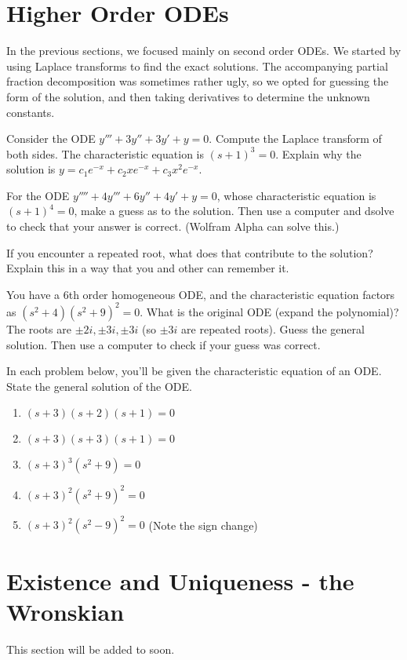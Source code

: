 \section{Higher Order ODEs}
In the previous sections, we focused mainly on second order ODEs.  We started by using Laplace transforms to find the exact solutions.  The accompanying partial fraction decomposition was sometimes rather ugly, so we opted for guessing the form of the solution, and then taking derivatives to determine the unknown constants. 

\begin{problem}
 Consider the ODE $y'''+3y''+3y'+y=0$.  Compute the Laplace transform of both sides.  The characteristic equation is $(s+1)^3=0$. Explain why the solution is $y = c_1 e^{-x}+c_2 x e^{-x}+c_3 x^2e^{-x}.$ 

 For the ODE $y''''+4y'''+6y''+4y'+y=0$, whose characteristic equation is $(s+1)^4=0$, make a guess as to the solution. Then use a computer and dsolve to check that your answer is correct. (Wolfram Alpha can solve this.)

 If you encounter a repeated root, what does that contribute to the solution? Explain this in a way that you and other can remember it.
\end{problem}

\begin{problem}
 You have a 6th order homogeneous ODE, and the characteristic equation factors as $(s^2+4)(s^2+9)^2=0$. What is the original ODE (expand the polynomial)? The roots are $\pm 2i, \pm 3i, \pm 3i$ (so $\pm 3i$ are repeated roots). Guess the general solution.  Then use a computer to check if your guess was correct.
\end{problem}

\begin{problem}
 In each problem below, you'll be given the characteristic equation of an ODE. State the general solution of the ODE.
\begin{enumerate}
 \item $(s+3)(s+2)(s+1)=0$
 \item $(s+3)(s+3)(s+1)=0$
 \item $(s+3)^3(s^2+9)=0$
 \item $(s+3)^2(s^2+9)^2=0$
 \item $(s+3)^2(s^2-9)^2=0$ (Note the sign change)
\end{enumerate}
\end{problem}


\section{Existence and Uniqueness - the Wronskian}


This section will be added to soon.
